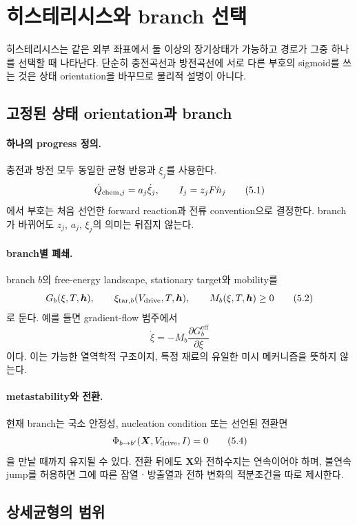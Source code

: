 \section{히스테리시스와 branch 선택}\label{HYS-CH5}

히스테리시스는 같은 외부 좌표에서 둘 이상의 장기상태가 가능하고
경로가 그중 하나를 선택할 때 나타난다. 단순히 충전곡선과 방전곡선에
서로 다른 부호의 sigmoid를 쓰는 것은 상태 orientation을 바꾸므로
물리적 설명이 아니다.

\subsection{고정된 상태 orientation과 branch}

\paragraph{ 하나의 progress 정의.}
충전과 방전 모두 동일한 균형 반응과 $\xi_j$를 사용한다.
\[
 \dot Q_{\mathrm{chem},j}=a_j\dot\xi_j,\qquad
 I_j=z_jF\dot n_j
 \tag{5.1}
\]
에서 부호는 처음 선언한 forward reaction과 전류 convention으로
결정한다. branch가 바뀌어도 $z_j$, $a_j$, $\xi_j$의 의미는
뒤집지 않는다.

\paragraph{ branch별 폐쇄.}
branch $b$의 free-energy landscape, stationary target와 mobility를
\[
 G_b(\xi,T,\bm h),\qquad
 \xi_{\mathrm{tar},b}(V_{\mathrm{drive}},T,\bm h),\qquad
 M_b(\xi,T,\bm h)\ge0
 \tag{5.2}
\]
로 둔다. 예를 들면 gradient-flow 범주에서
\[
 \dot\xi=-M_b\frac{\partial G_b^\mathrm{eff}}{\partial\xi}
 \tag{5.3}
\]
이다. 이는 가능한 열역학적 구조이지, 특정 재료의 유일한
미시 메커니즘을 뜻하지 않는다.

\paragraph{ metastability와 전환.}
현재 branch는 국소 안정성, nucleation condition 또는 선언된
전환면
\[
 \Phi_{b\to b'}(\bm X,V_{\mathrm{drive}},I)=0
 \tag{5.4}
\]
을 만날 때까지 유지될 수 있다. 전환 뒤에도 $\bm X$와 전하수지는
연속이어야 하며, 불연속 jump를 허용하면 그에 따른 잠열ㆍ방출열과
전하 변화의 적분조건을 따로 제시한다.

\subsection{상세균형의 범위}

